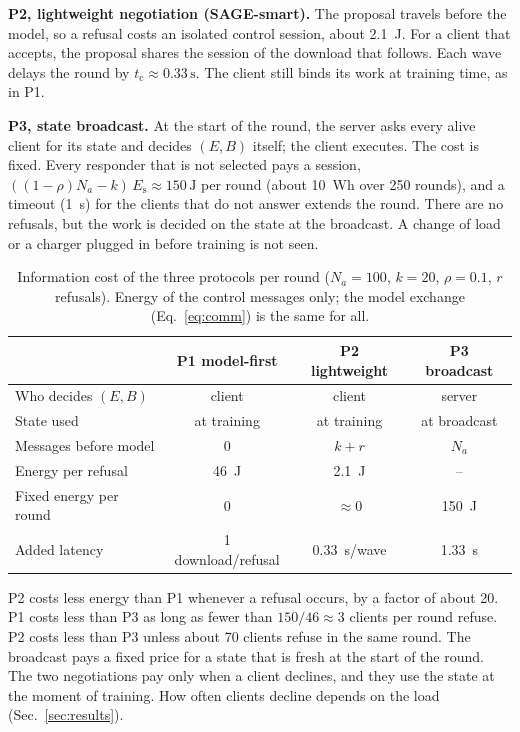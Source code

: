 \textbf{P2, lightweight negotiation (SAGE-smart).} The proposal travels before
the model, so a refusal costs an isolated control session, about 2.1~J.
For a client that accepts, the proposal shares the session of the download
that follows. Each wave delays the round by $t_{\mathrm{c}}\approx0.33\,\mathrm{s}$.
The client still binds its work at training time, as in P1.

\textbf{P3, state broadcast.} At the start of the round, the server asks every
alive client for its state and decides $(E,B)$ itself; the client executes. The
cost is fixed. Every responder that is not selected pays a session,
$((1-\rho)N_a-k)\,E_{\mathrm{s}}\approx150\,\mathrm{J}$ per round (about
10~Wh over 250 rounds), and a timeout (1~s) for the clients that do
not answer extends the round. There are no refusals, but the work is decided
on the state at the broadcast. A change of load or a charger plugged in before
training is not seen.

\begin{table}[t]
\centering
\caption{Information cost of the three protocols per round ($N_a=100$, $k=20$,
$\rho=0.1$, $r$ refusals). Energy of the control messages only; the model
exchange (Eq.~\ref{eq:comm}) is the same for all.}
\label{tab:protocols}
\footnotesize
\setlength{\tabcolsep}{3pt}
\begin{tabular}{lccc}
\hline
& P1 model-first & P2 lightweight & P3 broadcast \\
\hline
Who decides $(E,B)$     & client          & client          & server \\
State used              & at training     & at training     & at broadcast \\
Messages before model   & 0               & $k+r$           & $N_a$ \\
Energy per refusal      & 46~J      & 2.1~J     & -- \\
Fixed energy per round  & 0               & $\approx 0$     & 150~J \\
Added latency           & 1 download/refusal & 0.33~s/wave & 1.33~s \\
\hline
\end{tabular}
\end{table}

P2 costs less energy than P1 whenever a refusal occurs, by a factor of about
20. P1 costs less than P3 as long as fewer than
$150/46\approx3$ clients per round refuse. P2 costs less than P3 unless about
70 clients refuse in the same round. The broadcast pays a fixed price for a
state that is fresh at the start of the round. The two negotiations pay only
when a client declines, and they use the state at the moment of training. How
often clients decline depends on the load (Sec.~\ref{sec:results}).

